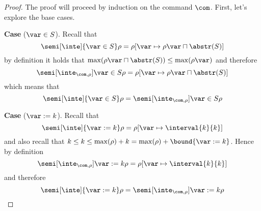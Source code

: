 \begin{proof}
  The proof will proceed by induction on the command \(\com\). First,
  let's explore the base cases.

  \medskip

  \textbf{Case} (\(\var \in S\)).
  Recall that
  \begin{equation*}
    \semi[\inte]{\var\in S}\rho = \rho[\var \mapsto \rho\var \sqcap \abstr(S)]
  \end{equation*}
  by definition it holds that
  \(\max(\rho\var \sqcap \abstr(S)) \leq \max(\rho\var)\) and
  therefore
  \begin{equation*}
    \semi[\inte_{\com,\rho}]{\var\in S}\rho = \rho[\var \mapsto \rho\var \sqcap \abstr(S)]
  \end{equation*}
  which means that
  \begin{equation*}
    \semi[\inte]{\var\in S}\rho = \semi[\inte_{\com,\rho}]{\var\in S}\rho
  \end{equation*}

  \medskip

  \noindent
  \textbf{Case} (\(\var := k\)).
  Recall that
  \begin{equation*}
    \semi[\inte]{\var := k}\rho = \rho[\var \mapsto \interval{k}{k}]
  \end{equation*}
  and also recall that
  \(k \leq k \leq \max(\rho) + k = \max(\rho) + \bound{\var :=
    k}\). Hence by definition
  \begin{equation*}
    \semi[\inte_{\com,\rho}]{\var := k}\rho = \rho[\var \mapsto \interval{k}{k}]
  \end{equation*}
  and therefore
  \begin{equation*}
    \semi[\inte]{\var := k}\rho = \semi[\inte_{\com,\rho}]{\var := k}\rho
  \end{equation*}

  \medskip


\end{proof}
